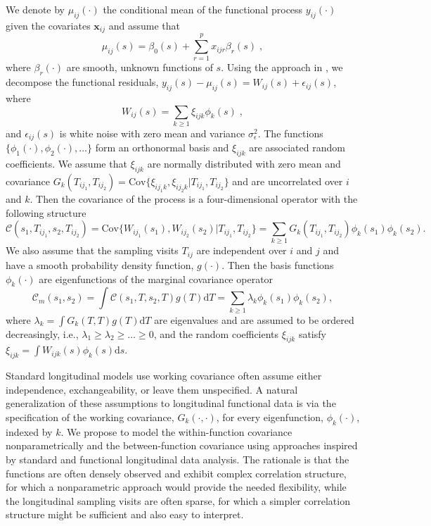 \documentclass[submit]{smj}
\def\bC{\mathbf{C}}
\def\bx {\mathbf{x}}
\def\bC{\mathcal{C}}
\begin{document}
We denote by $\mu_{ij}(\cdot)$ the conditional mean of the functional process $y_{ij}(\cdot)$ given the covariates $\bx_{ij}$ and assume that \begin{equation}\label{eq:mean}
\mu_{ij}(s) = \beta_0(s) + \sum_{r=1}^p x_{ijr} \beta_r(s)\;,
\end{equation}
where $\beta_r(\cdot)$ are smooth, unknown functions of $s$. Using the approach in \cite{Park2015}, we decompose the functional residuals, $y_{ij}(s) - \mu_{ij}(s)=W_{ij}(s) + \epsilon_{ij}(s)$, where
\begin{equation*}
W_{ij}(s) = \sum_{k\geq 1} \xi_{ijk} \phi_k(s)\;, 
\end{equation*}
and $\epsilon_{ij}(s)$ is white noise with zero mean and variance $\sigma_{\epsilon}^2$. The functions $\{\phi_1(\cdot), \phi_2(\cdot),\ldots\}$ form an orthonormal basis and $\xi_{ijk}$ are associated random  coefficients. We assume that $\xi_{ijk}$ are normally distributed with zero mean and covariance $G_k(T_{ij_1}, T_{ij_2}) = \text{Cov}\{\xi_{ij_1k},\xi_{ij_2k}|T_{ij_1}, T_{ij_2}\}$
and are uncorrelated over $i$ and $k$. Then the covariance of the process is a four-dimensional operator with the following structure $$\bC(s_1, T_{ij_1}, s_2, T_{ij_2}) = \text{Cov}\big\{W_{ij_1}(s_1), W_{ij_2}(s_2)|T_{ij_1}, T_{ij_2}\big\} = \sum_{k\geq 1} G_k(T_{ij_1},T_{ij_2}) \phi_k(s_1)\phi_k(s_2).$$
We also assume that the sampling visits $T_{ij}$ are independent over $i$ and $j$ and have a smooth probability density function, $g(\cdot)$.  Then the basis functions $\phi_k(\cdot)$ are eigenfunctions of the  marginal covariance operator 
$$\bC_m(s_1, s_2) = \int \bC(s_1,T, s_2,T) g(T)\mathrm{d}T = \sum_{k\geq 1}\lambda_k \phi_k(s_1)\phi_k(s_2),$$
where $\lambda_k = \int G_k(T,T)g(T)\mathrm{d}T$ are eigenvalues and are assumed to be ordered decreasingly, i.e.,  $\lambda_1\geq \lambda_2\geq\ldots\geq 0$, and the random coefficients $\xi_{ijk}$ satisfy $\xi_{ijk} = \int W_{ijk}(s)\phi_k(s)\mathrm{d}s$.


Standard longitudinal models use working covariance often assume either independence, exchangeability, or leave them unspecified. A natural generalization of these assumptions to longitudinal functional data is via the specification of the working covariance, $G_k(\cdot,\cdot)$, for every eigenfunction, $\phi_k(\cdot)$, indexed by $k$. We propose to model the within-function covariance nonparametrically and the between-function covariance using approaches inspired by  standard and functional longitudinal data analysis. The rationale is that the functions are often densely observed and exhibit complex correlation structure, for which a nonparametric approach would provide the needed flexibility, while the longitudinal sampling visits are often sparse, for which a simpler correlation structure might be sufficient and also easy to interpret. 
\end{document}
